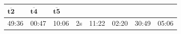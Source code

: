 \begin{xltabular}{\linewidth}[hbt]{@{}llllllll@{}}
\begin{minipage}[b]{0.07\columnwidth}
\(\bm{\overline{t2}}\)\strut
\end{minipage} & \begin{minipage}[b]{0.07\columnwidth}\raggedright
\(\bm{\overline{t4}}\)\strut
\end{minipage} & \begin{minipage}[b]{0.08\columnwidth}\raggedright
\(\bm{\overline{t5}}\)\strut
\end{minipage}\tabularnewline
\midrule
\endhead
\begin{minipage}[t]{0.07\columnwidth}\raggedright
49:36\strut
\end{minipage} & \begin{minipage}[t]{0.07\columnwidth}\raggedright
00:47\strut
\end{minipage} & \begin{minipage}[t]{0.07\columnwidth}\raggedright
10:06\strut
\end{minipage} & \begin{minipage}[t]{0.07\columnwidth}\raggedright
2s\strut
\end{minipage} & \begin{minipage}[t]{0.07\columnwidth}\raggedright
11:22\strut
\end{minipage} & \begin{minipage}[t]{0.07\columnwidth}\raggedright
02:20\strut
\end{minipage} & \begin{minipage}[t]{0.07\columnwidth}\raggedright
30:49\strut
\end{minipage} & \begin{minipage}[t]{0.08\columnwidth}\raggedright
05:06\strut
\end{minipage}\tabularnewline
\bottomrule
\end{xltabular}

